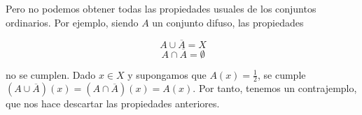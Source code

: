 Pero no podemos obtener todas las propiedades usuales de los conjuntos ordinarios. Por ejemplo, siendo $A$ un conjunto difuso, las propiedades

\[
\ A \cup \overline{A} = X
\]
\[
\ A \cap \overline{A} = \emptyset
\]

no se cumplen. Dado $x \in X$ y supongamos que $A(x)=\frac{1}{2}$, se cumple $\left( A \cup \overline{A} \right) (x) = \left( A \cap \overline{A} \right) (x) = A(x)$. Por tanto, tenemos un contrajemplo, que nos hace descartar las propiedades anteriores.\\

